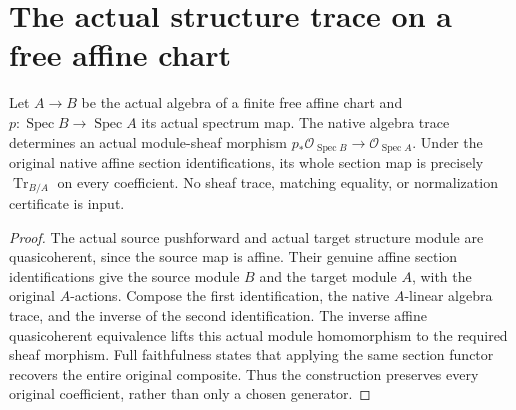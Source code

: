 \section{The actual structure trace on a free affine chart}

\begin{lemma}
\label{lem:kn-structure-trace-affine-sheaf}
\leanok
Let $A\to B$ be the actual algebra of a finite free affine chart and
$p:\operatorname{Spec}B\to\operatorname{Spec}A$ its actual spectrum map.
The native algebra trace determines an actual module-sheaf morphism
$p_*\mathcal O_{\operatorname{Spec}B}\to\mathcal O_{\operatorname{Spec}A}$.
Under the original native affine section identifications, its whole
section map is precisely $\operatorname{Tr}_{B/A}$ on every coefficient.
No sheaf trace, matching equality, or normalization certificate is input.
\end{lemma}
\begin{proof}
The actual source pushforward and actual target structure module are
quasicoherent, since the source map is affine. Their genuine affine
section identifications give the source module $B$ and the target
module $A$, with the original $A$-actions. Compose the first
identification, the native $A$-linear algebra trace, and the inverse
of the second identification. The inverse affine quasicoherent
equivalence lifts this actual module homomorphism to the required
sheaf morphism. Full faithfulness states that applying the same
section functor recovers the entire original composite. Thus the
construction preserves every original coefficient, rather than only
a chosen generator.
\end{proof}
